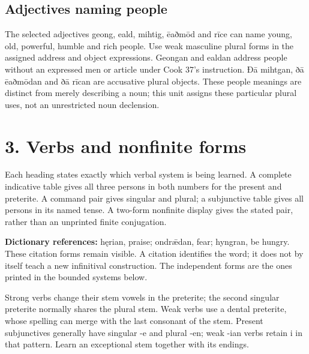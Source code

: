 \subsection*{Adjectives naming people}

The selected adjectives geong, eald, mihtig, ēaðmōd and rīce can name young, old, powerful, humble and rich people. Use weak masculine plural forms in the assigned address and object expressions. Geongan and ealdan address people without an expressed men or article under Cook 37’s instruction. Ðā mihtgan, ðā ēaðmōdan and ðā rīcan are accusative plural objects. These people meanings are distinct from merely describing a noun; this unit assigns these particular plural uses, not an unrestricted noun declension.

\section*{3. Verbs and nonfinite forms}

Each heading states exactly which verbal system is being learned. A complete indicative table gives all three persons in both numbers for the present and preterite. A command pair gives singular and plural; a subjunctive table gives all persons in its named tense. A two-form nonfinite display gives the stated pair, rather than an unprinted finite conjugation.

\textbf{Dictionary references:} hęrian, praise; ondrǣdan, fear; hyngran, be hungry. These citation forms remain visible. A citation identifies the word; it does not by itself teach a new infinitival construction. The independent forms are the ones printed in the bounded systems below.

Strong verbs change their stem vowels in the preterite; the second singular preterite normally shares the plural stem. Weak verbs use a dental preterite, whose spelling can merge with the last consonant of the stem. Present subjunctives generally have singular -e and plural -en; weak -ian verbs retain i in that pattern. Learn an exceptional stem together with its endings.

